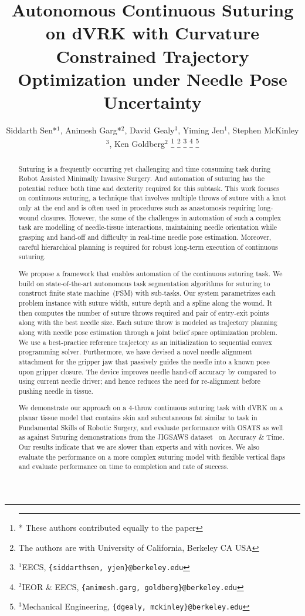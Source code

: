 \documentclass[letterpaper, 10 pt, conference]{ieeeconf}
\title{\LARGE \bf
Autonomous Continuous Suturing on dVRK with Curvature Constrained Trajectory Optimization under Needle Pose Uncertainty
}
\author{%
Siddarth Sen*$^{1}$, 
Animesh Garg*$^{2}$,
David Gealy$^{3}$,
Yiming Jen$^{1}$, 
Stephen McKinley$^{3}$,
Ken Goldberg$^{2}$%
\thanks{\hrule \vspace{3pt} * These authors contributed equally to the paper}
\thanks{The authors are with University of California, Berkeley CA USA}%
\thanks{$^{1}$EECS, \texttt{\{siddarthsen, yjen\}@berkeley.edu}}%
\thanks{$^{2}$IEOR \& EECS, \texttt{\{animesh.garg, goldberg\}@berkeley.edu}}%
\thanks{$^{3}$Mechanical Engineering, \texttt{\{dgealy, mckinley\}@berkeley.edu}}%
}
\begin{document}
\maketitle
\thispagestyle{empty}
\pagestyle{empty}

\begin{abstract}
Suturing is a frequently occurring yet challenging and time consuming task during Robot Assisted Minimally Invasive Surgery. And automation of suturing has the potential reduce both time and dexterity required for this subtask. 
This work focuses on continuous suturing, a technique that involves multiple throws of suture with a knot only at the end and is often used in procedures such as anastomosis requiring long-wound closures.
However, the some of the challenges in automation of such a complex task are modelling of needle-tissue interactions, maintaining needle orientation while grasping and hand-off and difficulty in real-time needle pose estimation. Moreover, careful hierarchical planning is required for robust long-term execution of continuous suturing. 

We propose a framework that enables automation of the continuous suturing task. We build on state-of-the-art autonomous task segmentation algorithms for suturing to construct finite state machine~(FSM) with sub-tasks. 
Our system parametrizes each problem instance with suture width, suture depth and a spline along the wound. It then computes the number of suture throws required and pair of entry-exit points along with the best needle size. Each suture throw is modeled as trajectory planning along with needle pose estimation through a joint belief space optimization problem.
We use a best-practice reference trajectory as an initialization to sequential convex programming solver. Furthermore, we have devised a novel needle alignment attachment for the gripper jaw that passively guides the needle into a known pose upon gripper closure. The device improves needle hand-off accuracy by  compared to using current needle driver; and hence reduces the need for re-alignment before pushing needle in tissue.  

We demonstrate our approach on a 4-throw continuous suturing task with dVRK on a planar tissue model that contains skin and subcutaneous fat similar to task in Fundamental Skills of Robotic Surgery, and evaluate performance with OSATS as well as against Suturing demonstrations from the JIGSAWS dataset~\cite{gao2014jhu} on Accuracy \& Time. Our results indicate that we are  slower than experts and  with novices. We also evaluate the performance on a more complex suturing model with flexible vertical flaps and evaluate performance on time to completion and rate of success.\\


\end{abstract}
\end{document}
